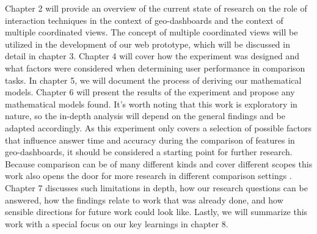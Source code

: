 Chapter 2 will provide an overview of the current state of research on the role of interaction techniques in the context of geo-dashboards
and the context of multiple coordinated views. The concept of multiple coordinated views will be utilized in the development of our web
prototype, which will be discussed in detail in chapter 3. Chapter 4 will cover how the experiment was designed and what factors were
considered when determining user performance in comparison tasks. In chapter 5, we will document the process of deriving our mathematical
models. Chapter 6 will present the results of the experiment and propose any mathematical models found. It's worth noting that this work is
exploratory in nature, so the in-depth analysis will depend on the general findings and be adapted accordingly. As this experiment only
covers a selection of possible factors that influence answer time and accuracy during the comparison of features in geo-dashboards, it should
be considered a starting point for further research. Because comparison can be of many different kinds and cover different scopes this work
also opens the door for more research in different comparison settings \citep*{Gleicher.2018}. Chapter 7 discusses such limitations in depth,
how our research questions can be answered, how the findings relate to work that was already done, and how sensible directions for future
work could look like. Lastly, we will summarize this work with a special focus on our key learnings in chapter 8.